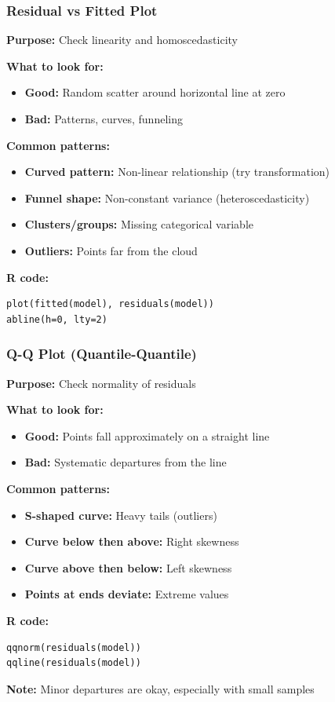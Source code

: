 \documentclass{beamer}
\begin{document}
\begin{frame}[fragile]
\frametitle{Residual vs Fitted Plot}
\textbf{Purpose:} Check linearity and homoscedasticity

\vspace{0.3cm}
\textbf{What to look for:}
\begin{itemize}
\item \textbf{Good:} Random scatter around horizontal line at zero
\item \textbf{Bad:} Patterns, curves, funneling
\end{itemize}

\vspace{0.5cm}
\textbf{Common patterns:}
\begin{itemize}
\item \textbf{Curved pattern:} Non-linear relationship (try transformation)
\item \textbf{Funnel shape:} Non-constant variance (heteroscedasticity)
\item \textbf{Clusters/groups:} Missing categorical variable
\item \textbf{Outliers:} Points far from the cloud
\end{itemize}

\vspace{0.3cm}
\textbf{R code:}
\begin{verbatim}
plot(fitted(model), residuals(model))
abline(h=0, lty=2)
\end{verbatim}
\end{frame}

\begin{frame}[fragile]
\frametitle{Q-Q Plot (Quantile-Quantile)}
\textbf{Purpose:} Check normality of residuals

\vspace{0.3cm}
\textbf{What to look for:}
\begin{itemize}
\item \textbf{Good:} Points fall approximately on a straight line
\item \textbf{Bad:} Systematic departures from the line
\end{itemize}

\vspace{0.5cm}
\textbf{Common patterns:}
\begin{itemize}
\item \textbf{S-shaped curve:} Heavy tails (outliers)
\item \textbf{Curve below then above:} Right skewness
\item \textbf{Curve above then below:} Left skewness
\item \textbf{Points at ends deviate:} Extreme values
\end{itemize}

\vspace{0.3cm}
\textbf{R code:}
\begin{verbatim}
qqnorm(residuals(model))
qqline(residuals(model))
\end{verbatim}

\vspace{0.2cm}
\textbf{Note:} Minor departures are okay, especially with small samples
\end{frame}
\end{document}
